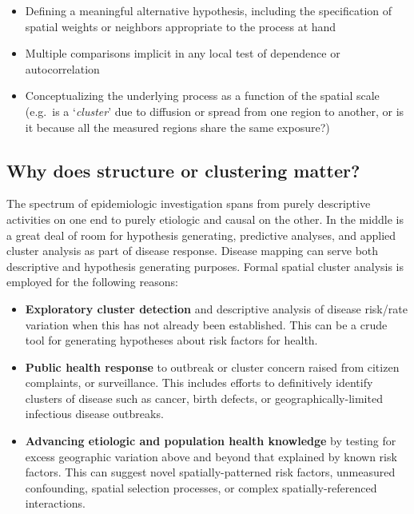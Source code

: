 \documentclass[
]{book}
\providecommand{\tightlist}{%
  \setlength{\itemsep}{0pt}\setlength{\parskip}{0pt}}
\begin{document}
\begin{itemize}
\tightlist
\item
  Defining a meaningful alternative hypothesis, including the specification of spatial weights or neighbors appropriate to the process at hand
\item
  Multiple comparisons implicit in any local test of dependence or autocorrelation
\item
  Conceptualizing the underlying process as a function of the spatial scale (e.g.~is a `\emph{cluster}' due to diffusion or spread from one region to another, or is it because all the measured regions share the same exposure?)
\end{itemize}

\hypertarget{why-does-structure-or-clustering-matter}{%
\subsection{Why does structure or clustering matter?}\label{why-does-structure-or-clustering-matter}}

The spectrum of epidemiologic investigation spans from purely descriptive activities on one end to purely etiologic and causal on the other. In the middle is a great deal of room for hypothesis generating, predictive analyses, and applied cluster analysis as part of disease response. Disease mapping can serve both descriptive and hypothesis generating purposes. Formal spatial cluster analysis is employed for the following reasons:

\begin{itemize}
\tightlist
\item
  \textbf{Exploratory cluster detection} and descriptive analysis of disease risk/rate variation when this has not already been established. This can be a crude tool for generating hypotheses about risk factors for health.
\item
  \textbf{Public health response} to outbreak or cluster concern raised from citizen complaints, or surveillance. This includes efforts to definitively identify clusters of disease such as cancer, birth defects, or geographically-limited infectious disease outbreaks.\\
\item
  \textbf{Advancing etiologic and population health knowledge} by testing for excess geographic variation above and beyond that explained by known risk factors. This can suggest novel spatially-patterned risk factors, unmeasured confounding, spatial selection processes, or complex spatially-referenced interactions.
\end{itemize}
\end{document}
